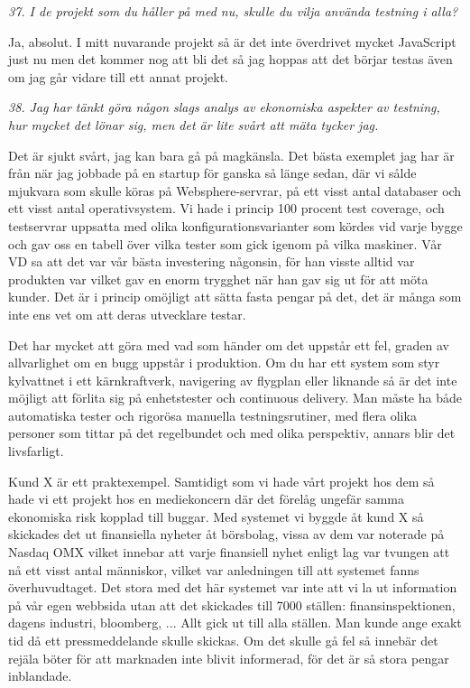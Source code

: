 \documentclass[11pt]{article}
\begin{document}
\emph{37. I de projekt som du håller på med nu, skulle du vilja använda testning i alla?}

Ja, absolut. I mitt nuvarande projekt så är det inte överdrivet mycket JavaScript just nu men det kommer nog att bli det så jag hoppas att det börjar testas även om jag går vidare till ett annat projekt.

\emph{38. Jag har tänkt göra någon slags analys av ekonomiska aspekter av testning, hur mycket det lönar sig, men det är lite svårt att mäta tycker jag.}

Det är sjukt svårt, jag kan bara gå på magkänsla. Det bästa exemplet jag har är från när jag jobbade på en startup för ganska så länge sedan, där vi sålde mjukvara som skulle köras på Websphere-servrar, på ett visst antal databaser och ett visst antal operativsystem. Vi hade i princip 100 procent test coverage, och testservrar uppsatta med olika konfigurationsvarianter som kördes vid varje bygge och gav oss en tabell över vilka tester som gick igenom på vilka maskiner. Vår VD sa att det var vår bästa investering någonsin, för han visste alltid var produkten var vilket gav en enorm trygghet när han gav sig ut för att möta kunder. Det är i princip omöjligt att sätta fasta pengar på det, det är många som inte ens vet om att deras utvecklare testar.

Det har mycket att göra med vad som händer om det uppstår ett fel, graden av allvarlighet om en bugg uppstår i produktion. Om du har ett system som styr kylvattnet i ett kärnkraftverk, navigering av flygplan eller liknande så är det inte möjligt att förlita sig på enhetstester och continuous delivery. Man måste ha både automatiska tester och rigorösa manuella testningsrutiner, med flera olika personer som tittar på det regelbundet och med olika perspektiv, annars blir det livsfarligt.

Kund X är ett praktexempel. Samtidigt som vi hade vårt projekt hos dem så hade vi ett projekt hos en mediekoncern där det förelåg ungefär samma ekonomiska risk kopplad till buggar. Med systemet vi byggde åt kund X så skickades det ut finansiella nyheter åt börsbolag, vissa av dem var noterade på Nasdaq OMX vilket innebar att varje finansiell nyhet enligt lag var tvungen att nå ett visst antal människor, vilket var anledningen till att systemet fanns överhuvudtaget. Det stora med det här systemet var inte att vi la ut information på vår egen webbsida utan att det skickades till 7000 ställen: finansinspektionen, dagens industri, bloomberg, ... Allt gick ut till alla ställen. Man kunde ange exakt tid då ett pressmeddelande skulle skickas. Om det skulle gå fel så innebär det rejäla böter för att marknaden inte blivit informerad, för det är så stora pengar inblandade.
\end{document}
